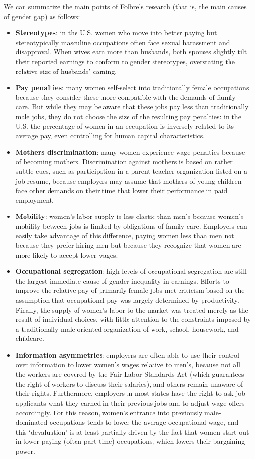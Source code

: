 We can summarize the main points of Folbre's research (that is, the main causes of gender gap) as follows:
\begin{itemize}
\item \textbf{Stereotypes}: in the U.S. women who move into better paying but stereotypically masculine occupations often face sexual harassment and disapproval. When wives earn more than husbands, both spouses slightly tilt their reported earnings to conform to gender stereotypes, overstating the relative size of husbands' earning.
\item \textbf{Pay penalties}: many women self-select into traditionally female occupations because they consider these more compatible with the demands of family care. But while they may be aware that these jobs pay less than traditionally male jobs, they do not choose the size of the resulting pay penalties: in the U.S. the percentage of women in an occupation is inversely related to its average pay, even controlling for human capital characteristics.
\item \textbf{Mothers discrimination}: many women experience wage penalties because of becoming mothers. Discrimination against mothers is based on rather subtle cues, such as participation in a parent-teacher organization listed on a job resume, because employers may assume that mothers of young children face other demands on their time that lower their performance in paid employment.
\item \textbf{Mobility}: women's labor supply is less elastic than men's because women's mobility between jobs is limited by obligations of family care. Employers can easily take advantage of this difference, paying women less than men not because they prefer hiring men but because they recognize that women are more likely to accept lower wages.
\item \textbf{Occupational segregation}: high levels of occupational segregation are still the largest immediate cause of gender inequality in earnings. Efforts to improve the relative pay of primarily female jobs met criticism based on the assumption that occupational pay was largely determined by productivity. Finally, the supply of women's labor to the market was treated merely as the result of individual choices, with little attention to the constraints imposed by a traditionally male-oriented organization of work, school, housework, and childcare.
\item \textbf{Information asymmetries}: employers are often able to use their control over information to lower women's wages relative to men's, because not all the workers are covered by the Fair Labor Standards Act (which guarantees the right of workers to discuss their salaries), and others remain unaware of their rights. Furthermore, employers in most states have the right to ask job applicants what they earned in their previous jobs and to adjust wage offers accordingly. For this reason, women's entrance into previously male-dominated occupations tends to lower the average occupational wage, and this `devaluation' is at least partially driven by the fact that women start out in lower-paying (often part-time) occupations, which lowers their bargaining power.

\end{itemize}
